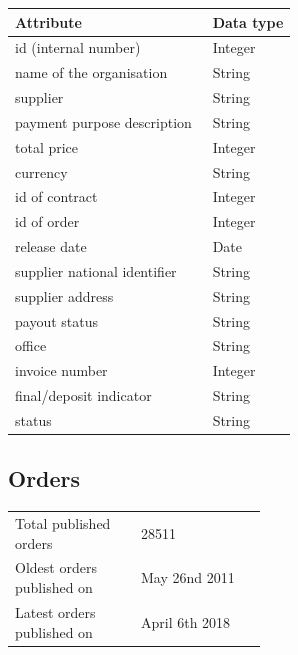 \documentclass[thesis=B,english]{FITthesis}[2012/06/26]
\begin{document}
    \begin{center}
        \begin{tabular}{  p{0.7\linewidth} | p{0.3\linewidth} }
        Attribute & Data type\\ \hline
        id (internal number) & Integer \\
        name of the organisation & String \\
        supplier & String \\
        payment purpose description & String \\
        total price & Integer \\
        currency & String \\
        id of contract & Integer \\
        id of order & Integer \\
        release date & Date \\
        supplier national identifier & String \\
        supplier address & String \\
        payout status & String \\
        office & String \\
        invoice number & Integer \\
        final/deposit indicator & String \\
        status & String \\
        \end{tabular}
    \end{center}
    \newpage
	\subsection{Orders}
	\begin{tabular}{  p{0.5\linewidth}  l }
        \\
        Total published orders & 28511 \\
        Oldest orders published on & May 26nd 2011\\
        Latest orders published on & April 6th 2018 \\
        \end{tabular}
        
\end{document}

